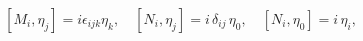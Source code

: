 \begin{equation}\label{3}
  [M_i, \eta_j] = i\epsilon_{ijk}\eta_k, \quad [N_i, \eta_j] = i\, \delta_{ij}\, \eta_0, \quad [N_i, \eta_0] = i\,  \eta_i,
\end{equation}

